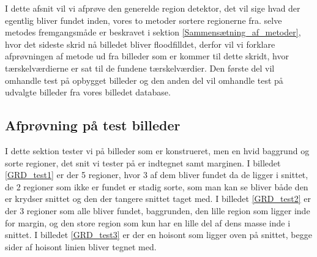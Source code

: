 I dette afsnit vil vi afprøve den generelde region detektor, det vil
sige hvad der egentlig bliver fundet inden, vores to metoder sortere
regionerne fra. selve metodes fremgangsmåde er beskravet i sektion
\ref{Sammensætning_af_metoder}, hvor det sideste skrid nå billedet
bliver floodfilldet, derfor vil vi forklare afprøvningen af metode ud
fra billeder som er kommer til dette skridt, hvor tærskelværdierne er
sat til de fundene tærskelværdier. Den første del vil omhandle test på
opbygget billeder og den anden del vil omhandle test på udvalgte
billeder fra vores billedet database.

\subsection{Afprøvning på test billeder}
I dette sektion tester vi på billeder som er konstrueret, men en hvid
baggrund og sorte regioner, det snit vi tester på er indtegnet samt
marginen. I billedet \ref{GRD_test1} er der 5 regioner, hvor 3 af dem bliver
fundet da de ligger i snittet, de 2 regioner som ikke er fundet er
stadig sorte, som man kan se bliver både den er krydser snittet og den
der tangere snittet taget med. I billedet \ref{GRD_test2} er der 3 regioner som
alle bliver fundet, baggrunden, den lille region som ligger inde for
margin, og den store region som kun har en lille del af dens masse inde
i snittet. I billedet \ref{GRD_test3} er der en hoisont som ligger oven på
snittet, begge sider af hoisont linien bliver tegnet med.


